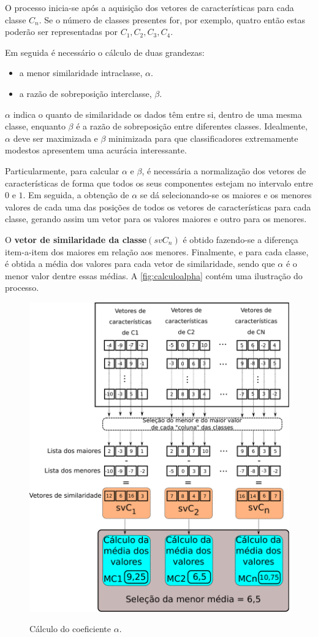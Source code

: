 			\par O processo inicia-se após a aquisição dos vetores de características para cada classe $C_n$. Se o número de classes presentes for, por exemplo, quatro então estas poderão ser representadas por $C_1, C_2, C_3, C_4$.
			\par Em seguida é necessário o cálculo de duas grandezas:
			
			\begin{itemize}
				\item a menor similaridade intraclasse, $\alpha$.
				\item a razão de sobreposição interclasse, $\beta$.
			\end{itemize}
	
			\par $\alpha$ indica o quanto de similaridade os dados têm entre si, dentro de uma mesma classe, enquanto $\beta$ é a razão de sobreposição entre diferentes classes. Idealmente, $\alpha$ deve ser maximizada e $\beta$ minimizada para que classificadores extremamente modestos apresentem uma acurácia interessante.
			
			\par Particularmente, para calcular $\alpha$ e $\beta$, é necessária a normalização dos vetores de características de forma que todos os seus componentes estejam no intervalo entre $0$ e $1$. Em seguida, a obtenção de $\alpha$ se dá selecionando-se os maiores e os menores valores de cada uma das posições de todos os vetores de características para cada classe, gerando assim um vetor para os valores maiores e outro para os menores.
			
			\par O \textbf{vetor de similaridade da classe}$(svC_n)$ é obtido fazendo-se a diferença item-a-item dos maiores em relação aos menores. Finalmente, e para cada classe, é obtida a média dos valores para cada vetor de similaridade, sendo que $\alpha$ é o menor valor dentre essas médias. A  \autoref{fig:calculoalpha} contém uma ilustração do processo.
	
			\begin{figure}[h]
				\centering
				\caption{Cálculo do coeficiente $\alpha$.}
				\includegraphics[width=0.5\linewidth]{images/calculoAlpha.pdf}
				\label{fig:calculoalpha}
			\end{figure}
			
